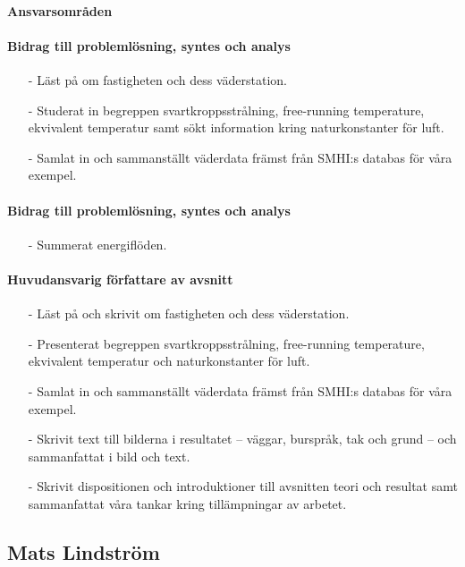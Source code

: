 \documentclass[12pt,a4paper]{article}
\begin{document}
\paragraph{Ansvarsområden}

\paragraph{Bidrag till problemlösning, syntes och analys}
\begin{itemize}
\item[-] Läst på om fastigheten och dess väderstation.
\item[-] Studerat in begreppen svartkroppsstrålning, free-running temperature, ekvivalent temperatur samt sökt information kring naturkonstanter för luft.
\item[-] Samlat in och sammanställt väderdata främst från SMHI:s databas för våra exempel.
\end{itemize}

\paragraph{Bidrag till problemlösning, syntes och analys}
\begin{itemize}
\item[-] Summerat energiflöden.
\end{itemize}
\paragraph{Huvudansvarig författare av avsnitt}


\begin{itemize}
\item[-] Läst på och skrivit om fastigheten och dess väderstation.
\item[-] Presenterat begreppen svartkroppsstrålning, free-running temperature, ekvivalent temperatur och naturkonstanter för luft.
\item[-] Samlat in och sammanställt väderdata främst från SMHI:s databas för våra exempel.
\item[-] Skrivit text till bilderna i resultatet – väggar, burspråk, tak och grund – och sammanfattat i bild och text.
\item[-] Skrivit dispositionen och introduktioner till avsnitten teori och resultat samt sammanfattat våra tankar kring tillämpningar av arbetet.
\end{itemize}


\subsection*{Mats Lindström}
\end{document}
